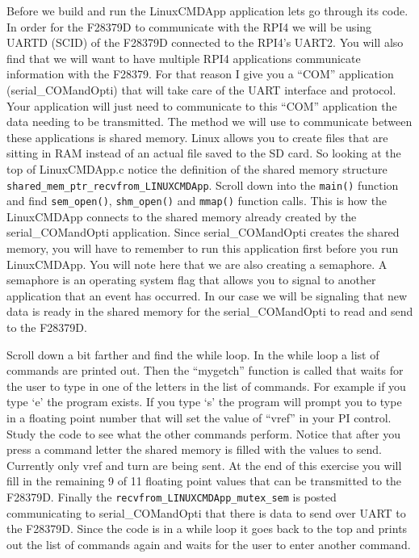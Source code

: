 \documentclass[11pt]{article}
\begin{document}
    Before we build and run the LinuxCMDApp application lets go through its code. In order for the F28379D to communicate with the RPI4 we will be using UARTD (SCID) of the F28379D connected to the RPI4’s UART2. You will also find that we will want to have multiple RPI4 applications communicate information with the F28379. For that reason I give you a “COM” application (serial\_COMandOpti) that will take care of the UART interface and protocol. Your application will just need to communicate to this “COM” application the data needing to be transmitted. The method we will use to communicate between these applications is shared memory. Linux allows you to create files that are sitting in RAM instead of an actual file saved to the SD card. So looking at the top of LinuxCMDApp.c notice the definition of the shared memory structure \texttt{shared_mem_ptr_recvfrom_LINUXCMDApp}. Scroll down into the \texttt{main()} function and find \texttt{sem_open()}, \texttt{shm_open()} and \texttt{mmap()} function calls. This is how the LinuxCMDApp connects to the shared memory already created by the serial\_COMandOpti application. Since serial\_COMandOpti creates the shared memory, you will have to remember to run this application first before you run LinuxCMDApp. You will note here that we are also creating a semaphore. A semaphore is an operating system flag that allows you to signal to another application that an event has occurred. In our case we will be signaling that new data is ready in the shared memory for the serial\_COMandOpti to read and send to the F28379D.

    Scroll down a bit farther and find the while loop. In the while loop a list of commands are printed out. Then the “mygetch” function is called that waits for the user to type in one of the letters in the list of commands. For example if you type ‘e’ the program exists. If you type ‘s’ the program will prompt you to type in a floating point number that will set the value of “vref” in your PI control. Study the code to see what the other commands perform. Notice that after you press a command letter the shared memory is filled with the values to send. Currently only vref and turn are being sent. At the end of this exercise you will fill in the remaining 9 of 11 floating point values that can be transmitted to the F28379D. Finally the \texttt{recvfrom_LINUXCMDApp_mutex_sem} is posted communicating to serial\_COMandOpti that there is data to send over UART to the F28379D. Since the code is in a while loop it goes back to the top and prints out the list of commands again and waits for the user to enter another command.
\end{document}
